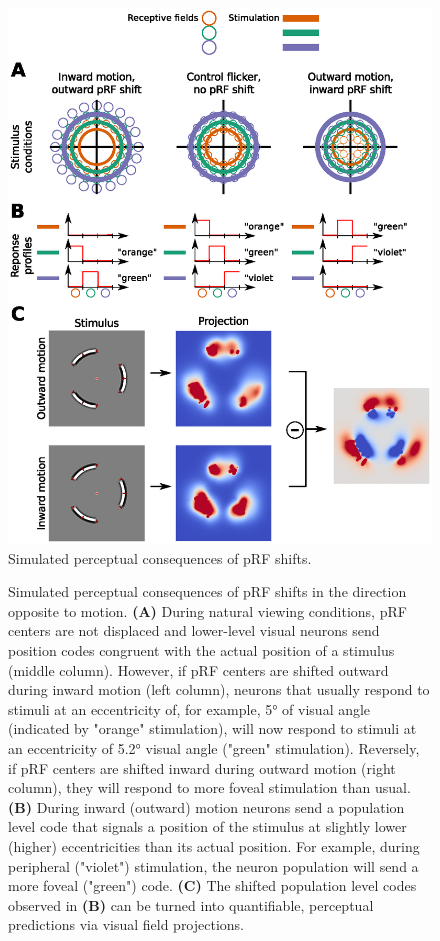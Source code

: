 \begin{figure}[htbp!]
\captionsetup{labelformat=simple}
\centering
\includegraphics[width=\textwidth]{figures/chapter_04/fig4.eps}
\caption{Simulated perceptual consequences of pRF shifts.}
\end{figure}

\begin{figure}[htb!]
\ContinuedFloat
\captionsetup{labelformat=adja-page}
\caption{Simulated perceptual consequences of pRF shifts in the direction opposite to motion. \textbf{(A)} During natural viewing conditions, pRF centers are not displaced and lower-level visual neurons send position codes congruent with the actual position of a stimulus (middle column). However, if pRF centers are shifted outward during inward motion (left column), neurons that usually respond to stimuli at an eccentricity of, for example, 5° of visual angle (indicated by "orange" stimulation), will now respond to stimuli at an eccentricity of 5.2° visual angle ("green" stimulation). Reversely, if pRF centers are shifted inward during outward motion (right column), they will respond to more foveal stimulation than usual. \textbf{(B)} During inward (outward) motion neurons send a population level code that signals a position of the stimulus at slightly lower (higher) eccentricities than its actual position. For example, during peripheral ("violet") stimulation, the neuron population will send a more foveal ("green") code. \textbf{(C)} The shifted population level codes observed in \textbf{(B)} can be turned into quantifiable, perceptual predictions via visual field projections.}
\label{fig:modelOv}
\noindent\hrulefill
\end{figure}

